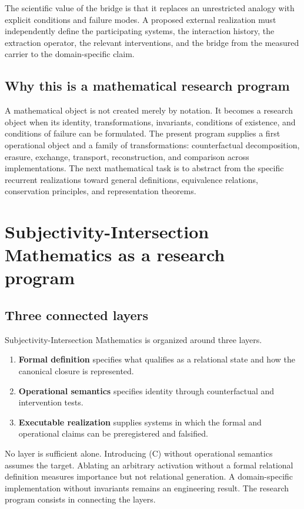 \documentclass[11pt,a4paper]{article}
\begin{document}
The scientific value of the bridge is that it replaces an unrestricted analogy with explicit conditions and failure modes. A proposed external realization must independently define the participating systems, the interaction history, the extraction operator, the relevant interventions, and the bridge from the measured carrier to the domain-specific claim.

\subsection{Why this is a mathematical research program}

A mathematical object is not created merely by notation. It becomes a research object when its identity, transformations, invariants, conditions of existence, and conditions of failure can be formulated. The present program supplies a first operational object and a family of transformations: counterfactual decomposition, erasure, exchange, transport, reconstruction, and comparison across implementations. The next mathematical task is to abstract from the specific recurrent realizations toward general definitions, equivalence relations, conservation principles, and representation theorems.

\section{Subjectivity-Intersection Mathematics as a research program}

\subsection{Three connected layers}

Subjectivity-Intersection Mathematics is organized around three layers.
\begin{enumerate}
  \item \textbf{Formal definition} specifies what qualifies as a relational state and how the canonical closure is represented.
  \item \textbf{Operational semantics} specifies identity through counterfactual and intervention tests.
  \item \textbf{Executable realization} supplies systems in which the formal and operational claims can be preregistered and falsified.
\end{enumerate}
No layer is sufficient alone. Introducing (C) without operational semantics assumes the target. Ablating an arbitrary activation without a formal relational definition measures importance but not relational generation. A domain-specific implementation without invariants remains an engineering result. The research program consists in connecting the layers.
\end{document}
